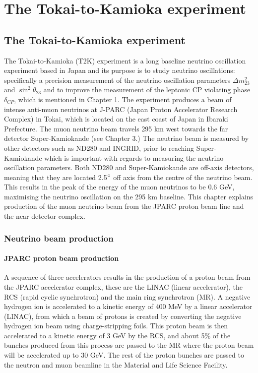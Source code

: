 \chapter{The Tokai-to-Kamioka experiment}
\label{chp:t2kdetector}

\section{The Tokai-to-Kamioka experiment}
The Tokai-to-Kamioka (T2K) experiment is a long baseline neutrino oscillation experiment based in Japan and its purpose is to study neutrino oscillations: specifically a precision measurement of the neutrino oscillation parameters $\Delta m_{23}^{2}$ and $\sin ^{2} \theta_{23}$ and to improve the measurement of the leptonic CP violating phase $\delta_{CP}$, which is mentioned in Chapter 1. The experiment produces a beam of intense anti-muon neutrinos at J-PARC (Japan Proton Accelerator Research Complex) in Tokai, which is located on the east coast of Japan in Ibaraki Prefecture. The muon neutrino beam travels 295 km west towards the far detector Super-Kamiokande (see Chapter 3.)  The neutrino beam is measured by other detectors such as ND280 and INGRID, prior to reaching Super-Kamiokande which is important with regards to measuring the neutrino oscillation parameters. Both ND280 and Super-Kamiokande are off-axis detectors, meaning that they are located 2.5$\degree$ off axis from the centre of the neutrino beam. This results in the peak of the energy of the muon neutrinos to be 0.6 GeV, maximising the neutrino oscillation on the 295 km baseline. This chapter explains production of the muon neutrino beam from the JPARC proton beam line and the near detector complex.


\subsection{Neutrino beam production}

\subsubsection{JPARC proton beam production}


A sequence of three accelerators results in the production of a proton beam from the JPARC accelerator complex, these are the LINAC (linear accelerator), the RCS (rapid cyclic synchrotron) and the main ring synchrotron (MR). A negative hydrogen ion is accelerated to a kinetic energy of 400 MeV by a linear accelerator (LINAC), from which a beam of protons is created by converting the negative hydrogen ion beam using charge-stripping foils. This proton beam is then accelerated to a kinetic energy of 3 GeV by the RCS, and about 5\% of the bunches produced from this process are passed to the MR where the proton beam will be accelerated up to 30 GeV. The rest of the proton bunches are passed to the neutron and muon beamline in the Material and Life Science Facility. 

